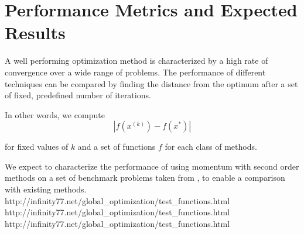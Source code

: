 \documentclass{article}
\begin{document}
\section{Performance Metrics and Expected Results}

A well performing optimization method is characterized by a high rate of convergence over a wide range of problems. The performance of different techniques can be compared by finding the distance from the optimum after a set of fixed, predefined number of iterations.

In other words, we compute
\begin{equation}
|f(x^{(k)}) - f(x^*)|
\end{equation}

for fixed values of $k$ and a set of functions $f$ for each class of methods.

We expect to characterize the performance of using momentum with second order methods on a set of benchmark problems taken from \citep{jamil2013literature}, to enable a comparison with existing methods.
http://infinity77.net/global\_optimization/test\_functions.html
http://infinity77.net/global\_optimization/test\_functions.html
http://infinity77.net/global\_optimization/test\_functions.html


\end{document}
